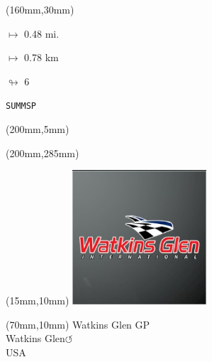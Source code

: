 \begin{textblock*}{40mm}(160mm,30mm)%
\Large
\par$\mapsto$ 0.48 mi.
\par$\mapsto$ 0.78 km
\par$\looparrowright$ 6
\par\hfill\tiny\tt SUMMSP\\
\end{textblock*}
\begin{textblock*}{20mm}(200mm,5mm)%
\fbox{\thepage}
\label{SUMMSP}
\end{textblock*}
\begin{textblock*}{20mm}(200mm,285mm)%
\fbox{\thepage}
\end{textblock*}

\null\newpage
\begin{textblock*}{50mm}(15mm,10mm)%
\includegraphics[width=50mm]{LG/2015-05-20_00097.png}
\end{textblock*}
\begin{textblock*}{130mm}(70mm,10mm)%
{\fontsize{20}{20}\selectfont Watkins Glen GP\\}
{\fontsize{16}{16}\selectfont Watkins Glen\hfill \huge$\circlearrowleft$\\}
{\fontsize{12}{12}\selectfont USA\\}
\end{textblock*}
